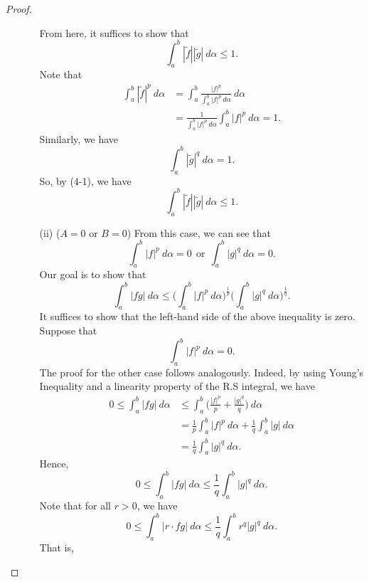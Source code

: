 \documentclass[a4paper]{article}
\begin{document}
\begin{proof}
\begin{enumerate}
\begin{enumerate}
        From here, it suffices to show that 
        \[  \int_{ a }^{ b }  | \tilde{f} |  | \tilde{g} |  \ d \alpha \leq 1.  \]
        Note that 
        \begin{align*}
            \int_{ a }^{ b }  | \tilde{f} |^{p}  \ d \alpha &= \int_{ a }^{ b }  \frac{ | f |^{p} }{  \int_{ a }^{ b }  | f |^{p} \ d \alpha }  \ d \alpha   \\
                                                            &= \frac{ 1 }{ \int_{ a }^{ b }  | f |^{p} \ d \alpha }  \int_{ a }^{ b }  | f |^{p}  \ d \alpha = 1.
        \end{align*}
        Similarly, we have 
            \[  \int_{ a }^{ b }  | \tilde{g} |^{q}  \ d \alpha = 1.  \]
            So, by (4-1), we have 
            \[  \int_{ a }^{ b }  | \tilde{f} |  | \tilde{g} |  \ d \alpha \leq 1.  \]
    \item[(ii)] (\( A = 0 \) or \( B = 0 \)) From this case, we can see that 
        \[  \int_{ a }^{ b }  | f |^{p} \ d \alpha = 0 \ \ \text{or} \ \  \int_{ a }^{ b }  | g |^{q} \ d \alpha = 0.  \]
        Our goal is to show that 
        \[  \int_{ a }^{ b }  | fg  |   \ d \alpha \leq \Big( \int_{ a }^{ b }  | f |^{p} \ d \alpha \Big)^{\frac{ 1 }{ p } } \Big(  \int_{ a }^{ b }  | g |^{q}  \ d \alpha \Big)^{\frac{ 1 }{ q }}.  \]
        It suffices to show that the left-hand side of the above inequality is zero. Suppose that 
        \[  \int_{ a }^{ b }  | f |^{p} \ d \alpha = 0.  \]
        The proof for the other case follows analogously. Indeed, by using Young's Inequality and a linearity property of the R.S integral, we have 
        \begin{align*}
        0 \leq \int_{ a }^{ b }  | fg |  \ d \alpha &\leq \int_{ a }^{ b }  \Big(  \frac{ | f |^{p} }{  p  }  + \frac{ | g |^{q} }{q}   \Big) \ d \alpha \\
                                             &=  \frac{ 1 }{ p }  \int_{ a }^{ b }  | f |^{p} \ d \alpha + \frac{ 1 }{ q }  \int_{ a }^{ b }  | g |  \ d \alpha \\
                                             &= \frac{ 1 }{ q } \int_{ a }^{ b }  | g |^{q} \ d \alpha.
        \end{align*}
        Hence, 
        \[  0 \leq \int_{ a }^{ b }  | fg |   \ d \alpha \leq \frac{ 1 }{ q }  \int_{ a }^{ b }  | g |^{q} \ d \alpha.  \]
        Note that for all \( r > 0  \), we have 
        \[  0 \leq \int_{ a }^{ b }  | r \cdot fg  |   \ d \alpha \leq \frac{ 1 }{ q }  \int_{ a }^{ b }  r^{q} | g |^{q}  \ d \alpha. \]
        That is, 

\end{enumerate}
\end{enumerate}
\end{proof}
\end{document}
